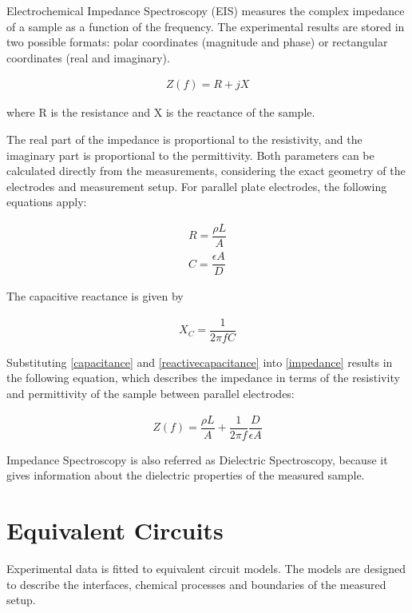 \documentclass[10pt,a4paper,oneside]{book}
\begin{document}
Electrochemical Impedance Spectroscopy (EIS) measures the complex impedance of a sample as a function of the frequency. The experimental results are stored in two possible formats: polar coordinates (magnitude and phase) or rectangular coordinates (real and imaginary).

\begin{align} \label{impedance}
	Z(f) = R + jX
\end{align}

where R is the resistance and X is the reactance of the sample.

The real part of the impedance is proportional to the resistivity, and the imaginary part is proportional to the permittivity. Both parameters can be calculated directly from the measurements, considering the exact geometry of the electrodes and measurement setup. For parallel plate electrodes, the following equations apply:

\begin{align}
R = \dfrac{\rho L}{A} \label{resistance} \\
C = \dfrac{\epsilon A}{D} \label{capacitance}
\end{align}

The capacitive reactance is given by

\begin{align}
X_C = \dfrac{1}{2\pi{}fC}	\label{reactivecapacitance}
\end{align}

Substituting \eqref{capacitance} and \eqref{reactivecapacitance} into \eqref{impedance} results in the following equation, which describes the impedance in terms of the resistivity and permittivity of the sample between parallel electrodes:

\begin{align}
Z(f) = \dfrac{\rho L}{A} + \dfrac{1}{2\pi{}f} \dfrac{D}{\epsilon A}
\end{align}

Impedance Spectroscopy is also referred as Dielectric Spectroscopy, because it gives information about the dielectric properties of the measured sample.



\clearpage
\section{Equivalent Circuits}

Experimental data is fitted to equivalent circuit models. The models are designed to describe the interfaces, chemical processes and boundaries of the measured setup.
\end{document}
